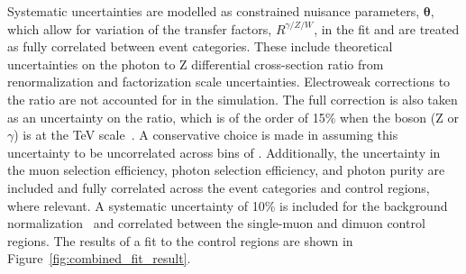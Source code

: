Systematic uncertainties are modelled as constrained nuisance parameters, $\boldsymbol{\theta}$, which allow for variation of 
the transfer factors, $R^{\gamma/Z/W}$, in the fit and are treated as fully correlated between event categories.
These include theoretical uncertainties on the photon to Z differential cross-section ratio from renormalization and factorization scale uncertainties. 
Electroweak corrections to the ratio are not accounted for in the simulation. The full correction is also taken as an uncertainty on the ratio, 
which is of the order of 15\% when the boson (Z or $\gamma$) \pt is at the TeV scale~\cite{Kuhn:2005gv}. A conservative choice is made in assuming 
this uncertainty to be uncorrelated across bins of \ETm. Additionally, the uncertainty in the muon selection efficiency, photon selection efficiency, 
and photon purity are included and fully correlated across the event categories and control regions, where relevant. A systematic uncertainty of 10\% 
is included for the background normalization~\cite{tagkey2015250} and correlated between the single-muon and dimuon control regions. The results of a fit to the control regions are shown in Figure~\ref{fig:combined_fit_result}.
 
